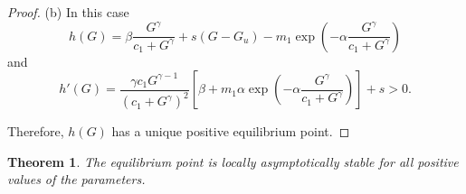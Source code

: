 \documentclass[pdflatex,sn-mathphys-num]{sn-jnl}
\theoremstyle{thmstyleone}
\newtheorem{theorem}{Theorem}[section]
\theoremstyle{thmstyletwo}
\theoremstyle{thmstylethree}
\begin{document}
\begin{proof}
(b) In this case 
\begin{equation}
h(G)=\beta\frac{G^{\gamma}}{c_1+G^{\gamma}}+s(G-G_u) 
-m_1\exp\left(-\alpha \frac{G^{\gamma}}{c_1+G^{\gamma}}  \right)
\end{equation}
and
\begin{equation}
h'(G) = \frac{\gamma c_1 G^{\gamma-1}}{(c_1 + G^{\gamma})^2} \left[ \beta + m_1 \alpha \exp\left(-\alpha \frac{G^{\gamma}}{c_1 + G^{\gamma}}\right) \right]+s>0.
\end{equation}

Therefore, $h(G)$ has a unique positive equilibrium point.
\end{proof}

\begin{theorem}
The equilibrium point is locally asymptotically stable for all positive values of the parameters. 
\end{theorem}
\end{document}
